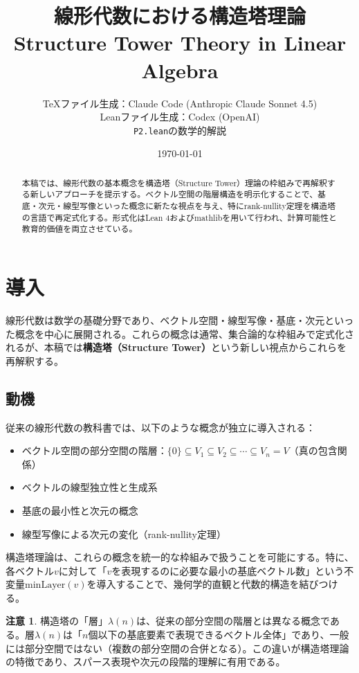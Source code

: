 \documentclass[a4paper,11pt]{ltjsarticle}
\title{線形代数における構造塔理論\\Structure Tower Theory in Linear Algebra}
\author{%
  TeXファイル生成：Claude Code (Anthropic Claude Sonnet 4.5)\\
  Leanファイル生成：Codex (OpenAI)\\
  \texttt{P2.lean}の数学的解説
}
\date{\today}
\theoremstyle{definition}
\newtheorem{remark}[definition]{注意}
\begin{document}
\maketitle

\begin{abstract}
本稿では、線形代数の基本概念を構造塔（Structure Tower）理論の枠組みで再解釈する新しいアプローチを提示する。ベクトル空間の階層構造を明示化することで、基底・次元・線型写像といった概念に新たな視点を与え、特にrank-nullity定理を構造塔の言語で再定式化する。形式化はLean 4およびmathlibを用いて行われ、計算可能性と教育的価値を両立させている。
\end{abstract}

\tableofcontents

\section{導入}

線形代数は数学の基礎分野であり、ベクトル空間・線型写像・基底・次元といった概念を中心に展開される。これらの概念は通常、集合論的な枠組みで定式化されるが、本稿では\textbf{構造塔（Structure Tower）}という新しい視点からこれらを再解釈する。

\subsection{動機}

従来の線形代数の教科書では、以下のような概念が独立に導入される：
\begin{itemize}
  \item ベクトル空間の部分空間の階層：$\{0\} \subseteq V_1 \subseteq V_2 \subseteq \cdots \subseteq V_n = V$（真の包含関係）
  \item ベクトルの線型独立性と生成系
  \item 基底の最小性と次元の概念
  \item 線型写像による次元の変化（rank-nullity定理）
\end{itemize}

構造塔理論は、これらの概念を統一的な枠組みで扱うことを可能にする。特に、各ベクトル$v$に対して「$v$を表現するのに必要な最小の基底ベクトル数」という不変量$\mathrm{minLayer}(v)$を導入することで、幾何学的直観と代数的構造を結びつける。

\begin{remark}
構造塔の「層」$\lambda(n)$は、従来の部分空間の階層とは異なる概念である。層$\lambda(n)$は「$n$個以下の基底要素で表現できるベクトル全体」であり、一般には部分空間ではない（複数の部分空間の合併となる）。この違いが構造塔理論の特徴であり、スパース表現や次元の段階的理解に有用である。
\end{remark}
\end{document}
